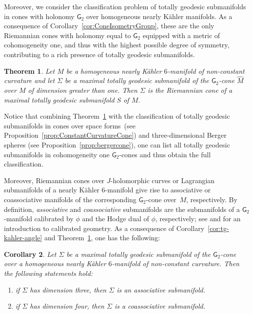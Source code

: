 \documentclass[11pt,a4paper,final]{amsart}
\newcommand{\s}{\mathsf}
\newtheorem{thmx}{Theorem}
\newtheorem{corx}[thmx]{Corollary}
\theoremstyle{definition}
\begin{document}
Moreover, we consider the classification problem of totally geodesic submanifolds in cones with holonomy $\s{G}_2$ over homogeneous nearly Kähler manifolds.
As a consequence of Corollary~\ref{cor:ConeIsometryGroup}, these are the only Riemannian cones with holonomy equal to $\s{G}_2$ equipped  with a metric of cohomogeneity one, and thus with the highest possible degree of symmetry, contributing to a rich presence of totally geodesic submanifolds. 
\begin{thmx}\label{th:tg-g2-cones}
	Let $M$ be a  homogeneous nearly Kähler $6$-manifold of non-constant curvature and let $\Sigma$ be a maximal totally geodesic submanifold of the $\s{G}_2$-cone $\widehat{M}$ over $M$ of dimension greater than one.	Then $\Sigma$ is the Riemannian cone of a maximal totally geodesic submanifold $S$ of $M$.
\end{thmx}
Notice that combining Theorem~\ref{th:tg-g2-cones} with the classification of totally geodesic submanifolds in cones over space forms~(see Proposition~\ref{prop:ConstantCurvatureCone}) and three-dimensional Berger spheres (see Proposition~\ref{prop:bergercone}), one can list all totally geodesic submanifolds in cohomogeneity one $\s{G}_2$-cones and thus obtain the full classification.


Moreover, Riemannian cones over $J$-holomorphic curves or Lagrangian submanifolds of a nearly Kähler $6$-manifold give rise to associative or coassociative manifolds of the corresponding $\s{G}_2$-cone over~$M$, respectively.
By definition, \textit{associative} and \textit{coassociative} submanifolds are the submanifolds of a $\s{G}_2$-manifold calibrated by $\phi$ and the Hodge dual of $\phi$, respectively; see \cite{HarveyLawson} and \cite[Chapters 4 and 12]{joyce} for an introduction to calibrated geometry.
As a consequence of Corollary~\ref{cor:tg-kahler-angle} and Theorem~\ref{th:tg-g2-cones}, one has the following:

\begin{corx}\label{cor:tg-associative-coassociative}
	Let $\Sigma$ be a maximal totally geodesic submanifold of the $\s{G}_2$-cone over a homogeneous nearly Kähler $6$-manifold of non-constant curvature.
	Then the following statements hold:
	\begin{enumerate}[\rm (i)]
		\item if $\Sigma$ has dimension three, then $\Sigma$ is an associative submanifold.
		\item if $\Sigma$ has dimension four, then $\Sigma$ is a coassociative submanifold.
	\end{enumerate}
\end{corx}
\end{document}
